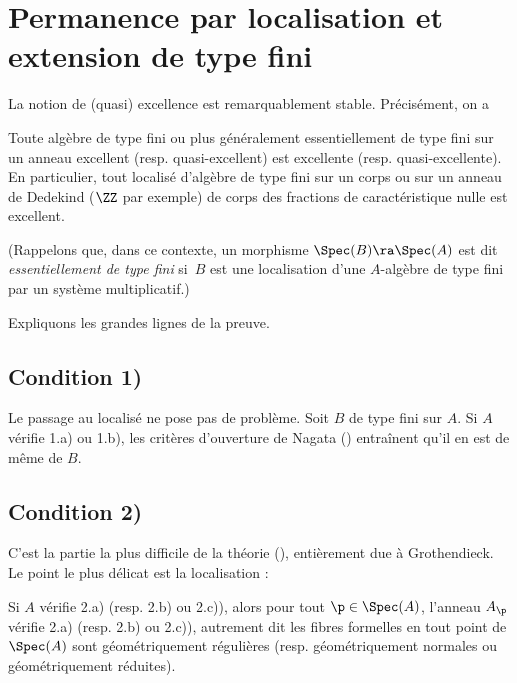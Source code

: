 \documentclass[10pt]{../fichiers-configuration-latex/smfart}
\begin{document}
\section{Permanence par localisation et extension de type fini}\label{1inv-exc} La notion de (quasi)
excellence est remarquablement stable.  Précisément, on a


\begin{theoreme}\label{1th-permanent} Toute algèbre de type fini ou plus généralement
essentiellement de type fini sur un anneau excellent (resp.  quasi-excellent) est excellente (resp.
quasi-excellente). En particulier, tout localisé d'algèbre de type fini sur un corps ou sur un
anneau de Dedekind ($\ZZ$ par exemple) de corps des fractions de caractéristique nulle est
excellent.\end{theoreme}

(Rappelons que, dans ce contexte, un morphisme $\Spec(B) \ra \Spec(A)$
est dit \emph{essentiellement de type fini} si $B$ est une
localisation d'une $A$-algèbre de type fini par un système
multiplicatif.)

Expliquons les grandes lignes de la preuve.

\subsection{Condition 1)} Le passage au localisé ne pose pas de problème. Soit $B$ de type fini sur
$A$. Si $A$ vérifie 1.a) ou 1.b), les critères d'ouverture de Nagata () entraînent qu'il en est de même de $B$.

\subsection{Condition 2)} C'est la partie la plus difficile de la théorie (),
entièrement due à Grothendieck. Le point le plus délicat est la localisation :

\begin{theoreme2} Si $A$ vérifie 2.a) (resp. 2.b) ou 2.c)), alors pour tout $\p\in\Spec(A)$,
l'anneau $A_\p$ vérifie 2.a) (resp. 2.b) ou 2.c)), autrement dit les fibres formelles en tout point
de $\Spec(A)$ sont géométriquement régulières (resp. géométriquement normales ou géométriquement
réduites).\end{theoreme2}
\end{document}
